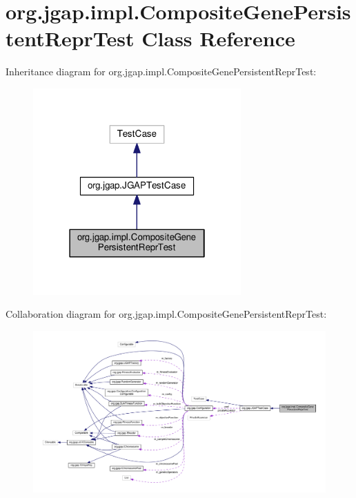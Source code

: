 \hypertarget{classorg_1_1jgap_1_1impl_1_1_composite_gene_persistent_repr_test}{\section{org.\-jgap.\-impl.\-Composite\-Gene\-Persistent\-Repr\-Test Class Reference}
\label{classorg_1_1jgap_1_1impl_1_1_composite_gene_persistent_repr_test}
}


Inheritance diagram for org.\-jgap.\-impl.\-Composite\-Gene\-Persistent\-Repr\-Test\-:
\nopagebreak
\begin{figure}[H]
\begin{center}
\leavevmode
\includegraphics[width=226pt]{classorg_1_1jgap_1_1impl_1_1_composite_gene_persistent_repr_test__inherit__graph}
\end{center}
\end{figure}


Collaboration diagram for org.\-jgap.\-impl.\-Composite\-Gene\-Persistent\-Repr\-Test\-:
\nopagebreak
\begin{figure}[H]
\begin{center}
\leavevmode
\includegraphics[width=350pt]{classorg_1_1jgap_1_1impl_1_1_composite_gene_persistent_repr_test__coll__graph}
\end{center}
\end{figure}
